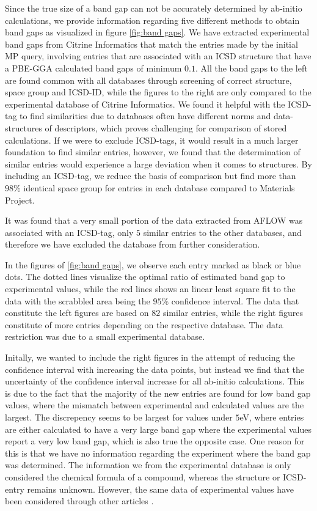 Since the true size of a band gap can not be accurately determined by ab-initio calculations, we provide information regarding five different methods to obtain band gaps as visualized in figure \ref{fig:band gaps}. We have extracted experimental band gaps from Citrine Informatics that match the entries made by the initial MP query, involving entries that are associated with an ICSD structure that have a PBE-GGA calculated band gaps of minimum $0.1$. All the band gaps to the left are found common with all databases through screening of correct structure, space group and ICSD-ID, while the figures to the right are only compared to the experimental database of Citrine Informatics. We found it helpful with the ICSD-tag to find similarities due to databases often have different norms and data-structures of descriptors, which proves challenging for comparison of stored calculations. If we were to exclude ICSD-tags, it would result in a much larger foundation to find similar entries, however, we found that the determination of similar entries would experience a large deviation when it comes to structures. By including an ICSD-tag, we reduce the basis of comparison but find more than $98\%$ identical space group for entries in each database compared to Materials Project.

It was found that a very small portion of the data extracted from AFLOW was associated with an ICSD-tag, only $5$ similar entries to the other databases, and therefore we have excluded the database from further consideration.

In the figures of \ref{fig:band gaps}, we observe each entry marked as black or blue dots. The dotted lines visualize the optimal ratio of estimated band gap to experimental values, while the red lines shows an linear least square fit to the data with the scrabbled area being the $95\%$ confidence interval. The data that constitute the left figures are based on $82$ similar entries, while the right figures constitute of more entries depending on the respective database. The data restriction was due to a small experimental database.

Initally, we wanted to include the right figures in the attempt of reducing the confidence interval with increasing the data points, but instead we find that the uncertainty of the confidence interval increase for all ab-initio calculations. This is due to the fact that the majority of the new entries are found for low band gap values, where the mismatch between experimental and calculated values are the largest. The discrepency seems to be largest for values under $5$eV, where entries are either calculated to have a very large band gap where the experimental values report a very low band gap, which is also true the opposite case. One reason for this is that we have no information regarding the experiment where the band gap was determined. The information we from the experimental database is only considered the chemical formula of a compound, whereas the structure or ICSD-entry remains unknown. However, the same data of experimental values have been considered through other articles \cite{Ward2018, Ferrenti2020}.

